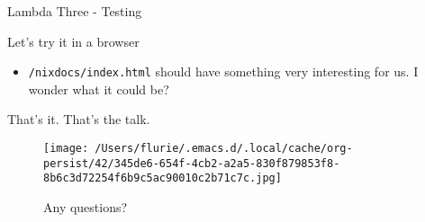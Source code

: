\documentclass[bigger]{beamer}
\begin{document}
\begin{frame}[label={sec:org4549245},fragile]{Lambda Three - Testing}
 \begin{exampleblock}{Let's try it in a browser}
\begin{itemize}
\item \texttt{/nixdocs/index.html} should have something very interesting for us. I wonder what it could be?
\end{itemize}
\end{exampleblock}
\end{frame}
\begin{frame}[label={sec:org5ab52fa}]{That's it. That's the talk.}
\begin{figure}[htbp]
\centering
\texttt{[image: /Users/flurie/.emacs.d/.local/cache/org-persist/42/345de6-654f-4cb2-a2a5-830f879853f8-8b6c3d72254f6b9c5ac90010c2b71c7c.jpg]}
\caption{Any questions?}
\end{figure}
\end{frame}
\end{document}
